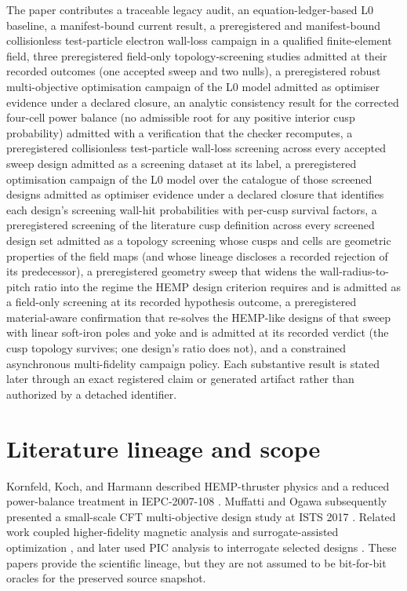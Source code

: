 \documentclass[11pt]{article}
\begin{document}
The paper contributes a traceable legacy audit, an equation-ledger-based L0
baseline, a manifest-bound current result, a preregistered and manifest-bound
collisionless test-particle electron wall-loss campaign in a qualified
finite-element field, three preregistered field-only topology-screening
studies admitted at their recorded outcomes (one accepted sweep and two
nulls), a preregistered robust multi-objective optimisation campaign of the L0
model admitted as optimiser evidence under a declared closure, an analytic
consistency result for the corrected four-cell power balance (no admissible root
for any positive interior cusp probability) admitted with a verification that
the checker recomputes, a preregistered collisionless test-particle wall-loss
screening across every accepted sweep design admitted as a screening dataset at
its label, a preregistered optimisation campaign of the L0 model over the
catalogue of those screened designs admitted as optimiser evidence under a
declared closure that identifies each design's screening wall-hit probabilities
with per-cusp survival factors, a preregistered screening of the literature
cusp definition across every screened design set admitted as a topology
screening whose cusps and cells are geometric properties of the field maps
(and whose lineage discloses a recorded rejection of its predecessor), a
preregistered geometry sweep that widens the wall-radius-to-pitch ratio into the
regime the HEMP design criterion requires and is admitted as a field-only
screening at its recorded hypothesis outcome, a preregistered material-aware
confirmation that re-solves the HEMP-like designs of that sweep with linear
soft-iron poles and yoke and is admitted at its recorded verdict (the cusp
topology survives; one design's ratio does not), and a
constrained asynchronous multi-fidelity campaign policy. Each substantive result
is stated later through an exact registered claim or generated artifact rather
than authorized by a detached identifier.

\section{Literature lineage and scope}

Kornfeld, Koch, and Harmann described HEMP-thruster physics and a reduced
power-balance treatment in IEPC-2007-108 \cite{Kornfeld2007}. Muffatti and
Ogawa subsequently presented a small-scale CFT multi-objective design study at
ISTS 2017 \cite{Muffatti2017}. Related work coupled higher-fidelity magnetic
analysis and surrogate-assisted optimization \cite{Fahey2017}, and later used
PIC analysis to interrogate selected designs \cite{Yeo2020}. These papers
provide the scientific lineage, but they are not assumed to be bit-for-bit
oracles for the preserved source snapshot.
\end{document}
